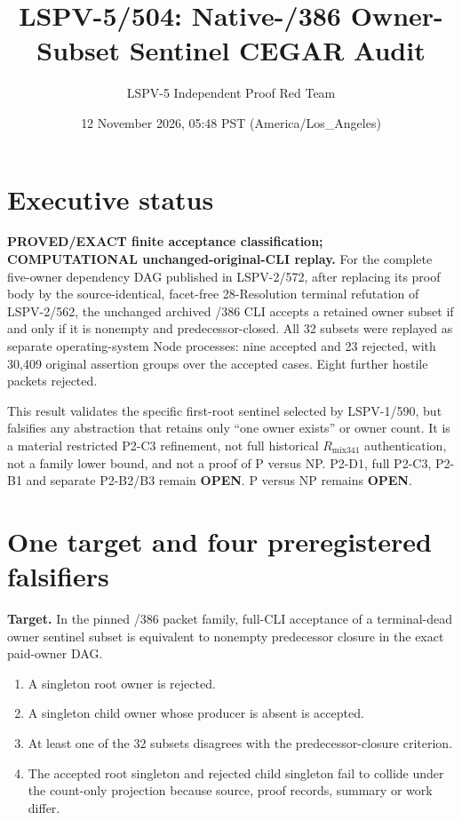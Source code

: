 \documentclass[11pt]{article}
\title{LSPV-5/504: Native-/386 Owner-Subset Sentinel CEGAR Audit}
\author{LSPV-5 Independent Proof Red Team}
\date{12 November 2026, 05:48 PST (America/Los\_Angeles)}
\begin{document}
\maketitle

\section*{Executive status}
\textbf{PROVED/EXACT finite acceptance classification; COMPUTATIONAL unchanged-original-CLI replay.}
For the complete five-owner dependency DAG published in LSPV-2/572, after replacing its proof body by the source-identical, facet-free 28-Resolution terminal refutation of LSPV-2/562, the unchanged archived /386 CLI accepts a retained owner subset if and only if it is nonempty and predecessor-closed.  All 32 subsets were replayed as separate operating-system Node processes: nine accepted and 23 rejected, with 30,409 original assertion groups over the accepted cases.  Eight further hostile packets rejected.

This result validates the specific first-root sentinel selected by LSPV-1/590, but falsifies any abstraction that retains only ``one owner exists'' or owner count.  It is a material restricted P2-C3 refinement, not full historical \(R_{\mathrm{mix341}}\) authentication, not a family lower bound, and not a proof of P versus NP.  P2-D1, full P2-C3, P2-B1 and separate P2-B2/B3 remain \textbf{OPEN}.  P versus NP remains \textbf{OPEN}.

\section*{One target and four preregistered falsifiers}
\textbf{Target.}  In the pinned /386 packet family, full-CLI acceptance of a terminal-dead owner sentinel subset is equivalent to nonempty predecessor closure in the exact paid-owner DAG.

\begin{enumerate}
\item A singleton root owner is rejected.
\item A singleton child owner whose producer is absent is accepted.
\item At least one of the 32 subsets disagrees with the predecessor-closure criterion.
\item The accepted root singleton and rejected child singleton fail to collide under the count-only projection because source, proof records, summary or work differ.
\end{enumerate}
\end{document}
